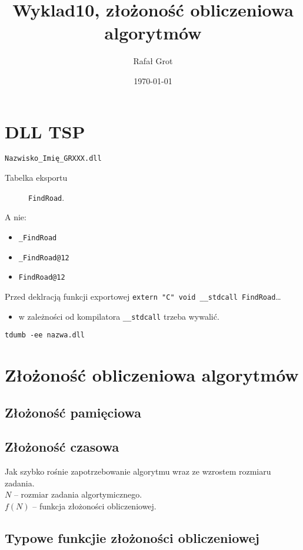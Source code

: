 \documentclass[11pt]{article}
\author{Rafał Grot}
\date{\today}
\title{Wyklad10, złożoność obliczeniowa algorytmów}
\begin{document}
\maketitle
\tableofcontents


\section{DLL TSP}
\label{sec:orgf0ffcaa}
\texttt{Nazwisko\_Imię\_GRXXX.dll}
\begin{description}
\item[{Tabelka eksportu}] \texttt{FindRoad}.
\end{description}

A nie:
\begin{itemize}
\item \texttt{\_FindRoad}
\item \texttt{\_FindRoad@12}
\item \texttt{FindRoad@12}
\end{itemize}

Przed deklracją funkcji exportowej
\texttt{extern "C" void \_\_stdcall FindRoad}\ldots{}
\begin{itemize}
\item w zależności od kompilatora \texttt{\_\_stdcall} trzeba wywalić.
\end{itemize}

\texttt{tdumb -ee nazwa.dll}
\section{Złożoność obliczeniowa algorytmów}
\label{sec:org8d7a141}
\subsection{Złożoność pamięciowa}
\label{sec:orgb8a5d8a}

\subsection{Złożoność czasowa}
\label{sec:org89c64fa}
Jak szybko rośnie zapotrzebowanie algorytmu wraz ze wzrostem rozmiaru zadania.\\\empty
\(N\) -- rozmiar zadania algortymicznego.\\\empty
\(f(N)\) -- funkcja złożoności obliczeniowej.
\subsection{Typowe funkcjie złożoności obliczeniowej}
\label{sec:org6556dbb}
\end{document}
